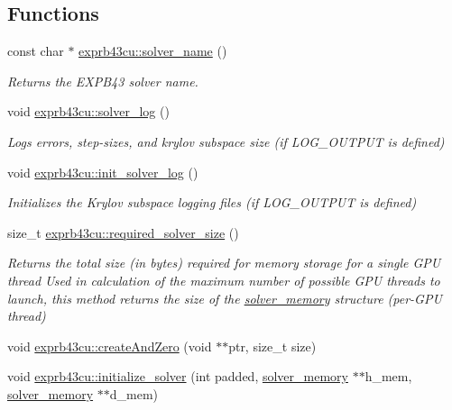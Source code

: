 \subsection*{Functions}
\begin{DoxyCompactItemize}
\item 
const char $\ast$ \hyperlink{namespaceexprb43cu_adb32cc589856026fca36d47f1982ee00}{exprb43cu\+::solver\+\_\+name} ()
\begin{DoxyCompactList}\small\item\em Returns the E\+X\+P\+B43 solver name. \end{DoxyCompactList}\item 
void \hyperlink{namespaceexprb43cu_a77622bf304d732c5402474fe69dbb4a2}{exprb43cu\+::solver\+\_\+log} ()
\begin{DoxyCompactList}\small\item\em Logs errors, step-\/sizes, and krylov subspace size (if L\+O\+G\+\_\+\+O\+U\+T\+P\+UT is defined) \end{DoxyCompactList}\item 
void \hyperlink{namespaceexprb43cu_a61e02bb434629c817de6934d514fc96c}{exprb43cu\+::init\+\_\+solver\+\_\+log} ()
\begin{DoxyCompactList}\small\item\em Initializes the Krylov subspace logging files (if L\+O\+G\+\_\+\+O\+U\+T\+P\+UT is defined) \end{DoxyCompactList}\item 
size\+\_\+t \hyperlink{namespaceexprb43cu_ad837089abb4cfc3819786aad86440da0}{exprb43cu\+::required\+\_\+solver\+\_\+size} ()
\begin{DoxyCompactList}\small\item\em Returns the total size (in bytes) required for memory storage for a single G\+PU thread Used in calculation of the maximum number of possible G\+PU threads to launch, this method returns the size of the \hyperlink{structexprb43cu_1_1solver__memory}{solver\+\_\+memory} structure (per-\/\+G\+PU thread) \end{DoxyCompactList}\item 
void \hyperlink{namespaceexprb43cu_a411c61dc481c439d2a19e8f17ec5af63}{exprb43cu\+::create\+And\+Zero} (void $\ast$$\ast$ptr, size\+\_\+t size)
\item 
void \hyperlink{namespaceexprb43cu_a6c8137b2fd79c625faa2773ea26deb10}{exprb43cu\+::initialize\+\_\+solver} (int padded, \hyperlink{structsolver__memory}{solver\+\_\+memory} $\ast$$\ast$h\+\_\+mem, \hyperlink{structsolver__memory}{solver\+\_\+memory} $\ast$$\ast$d\+\_\+mem)
$$
\end{DoxyCompactItemize}
